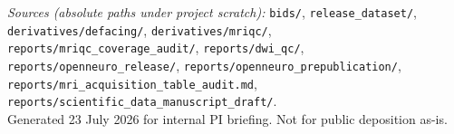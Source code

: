 \documentclass[11pt,a4paper]{article}
\begin{document}
\vspace{6mm}
\begin{center}
\end{center}

\vspace{4mm}
{\footnotesize
\noindent\textit{Sources (absolute paths under project scratch):}
\texttt{bids/}, \texttt{release\_dataset/}, \texttt{derivatives/defacing/}, \texttt{derivatives/mriqc/},
\texttt{reports/mriqc\_coverage\_audit/}, \texttt{reports/dwi\_qc/}, \texttt{reports/openneuro\_release/},
\texttt{reports/openneuro\_prepublication/}, \texttt{reports/mri\_acquisition\_table\_audit.md},
\texttt{reports/scientific\_data\_manuscript\_draft/}.\\
\noindent Generated 23 July 2026 for internal PI briefing. Not for public deposition as-is.
}
\end{document}
